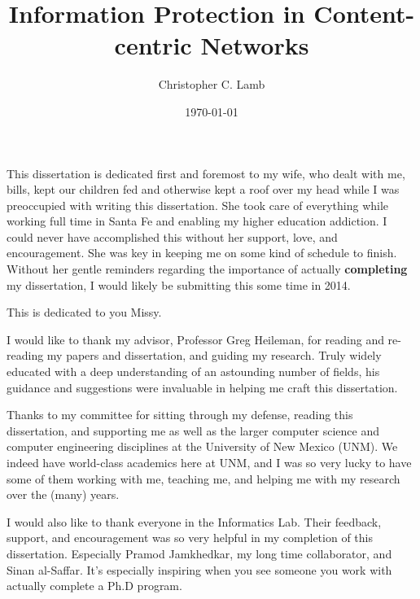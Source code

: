 \documentclass[botnum,fleqn,final]{unmeethesis}
\newcommand{\mytitle}{Information Protection in Content-centric Networks}
\newcommand{\myauthor}{Christopher C. Lamb}
\begin{document}
\frontmatter

\title{\mytitle}
\author{\myauthor}





\date{\today}

\maketitle

\makecopyright

\begin{dedication}
This dissertation is dedicated first and foremost to my wife, who dealt with me, bills, kept our children fed and otherwise kept a roof over my head while I was preoccupied with writing this dissertation.  She took care of everything while working full time in Santa Fe and enabling my higher education addiction.  I could never have accomplished this without her support, love, and encouragement.  She was key in keeping me on some kind of schedule to finish.  Without her gentle reminders regarding the importance of actually {\bf completing} my dissertation, I would likely be submitting this some time in 2014.

This is dedicated to you Missy.
\end{dedication}

\begin{acknowledgments}
   \vspace{1.1in}
I would like to thank my advisor, Professor Greg Heileman, for reading and re-reading my papers and dissertation, and guiding my research.  Truly widely educated with a deep understanding of an astounding number of fields, his guidance and suggestions were invaluable in helping me craft this dissertation.

Thanks to my committee for sitting through my defense, reading this dissertation, and supporting me as well as the larger computer science  and computer engineering disciplines at the University of New Mexico (UNM).  We indeed have world-class academics here at UNM, and I was so very lucky to have some of them working with me, teaching me, and helping me with my research over the (many) years.
   
I would also like to thank everyone in the Informatics Lab.  Their feedback, support, and encouragement was so very helpful in my completion of this dissertation.  Especially Pramod Jamkhedkar, my long time collaborator, and Sinan al-Saffar.  It's especially inspiring when you see someone you work with actually complete a Ph.D program.
\end{acknowledgments}
\end{document}
